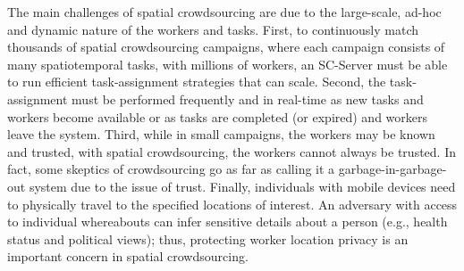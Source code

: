 The main challenges of spatial crowdsourcing are due to the large-scale, ad-hoc and dynamic nature of the workers and tasks.  First, to continuously match thousands of spatial crowdsourcing campaigns, where each campaign consists of many spatiotemporal tasks, with millions of workers, an SC-Server must be able to run efficient task-assignment strategies that can scale.  Second, the task-assignment must be performed frequently and in real-time as new tasks and workers become available or as tasks are completed (or expired) and workers leave the system.  Third, while in small campaigns, the workers may be known and trusted, with spatial crowdsourcing, the workers cannot always be trusted. In fact, some skeptics of crowdsourcing go as far as calling it a garbage-in-garbage-out system due to the issue of trust. Finally, individuals with mobile devices need to physically travel to the specified locations of interest. An adversary with access to individual whereabouts can infer sensitive details about a person (e.g., health status and political views); thus, protecting worker location privacy is an important concern in spatial crowdsourcing.
